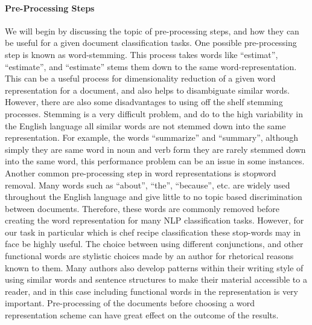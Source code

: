\documentclass[paper=a4, fontsize=11pt]{scrartcl} %
\begin{document}
\paragraph{Pre-Processing Steps}
We will begin by discussing the topic of pre-processing steps, and how they can be useful for a given document classification tasks.  
One possible pre-processing step is known as word-stemming.  
This process takes words like ``estimat'', ``estimate'', and ``estimate'' stems them down to the same word-representation.  
This can be a useful process for dimensionality reduction of a given word representation for a document, and also helps to disambiguate similar words.  
However, there are also some disadvantages to using off the shelf stemming processes.  Stemming is a very difficult problem, and do to the high variability in the English language all similar words are not stemmed down into the same representation.  
For example, the words ``summarize'' and ``summary'', although simply they are same word in noun and verb form they are rarely stemmed down into the same word, this performance problem can be an issue in some instances.  
Another common pre-processing step in word representations is stopword removal.  Many words such as ``about'', ``the'', ``because'', etc. are widely used throughout the English language and give little to no topic based discrimination between documents.  
Therefore, these words are commonly removed before creating the word representation for many NLP classification tasks.  However, for our task in particular which is chef recipe classification these stop-words may in face be highly useful.  
The choice between using different conjunctions, and other functional words are stylistic choices made by an author for rhetorical reasons known to them.  
Many authors also develop patterns within their writing style of using similar words and sentence structures to make their material accessible to a reader, and in this case including functional words in the representation is very important.  
Pre-processing of the documents before choosing a word representation scheme can have great effect on the outcome of the results.
\end{document}
